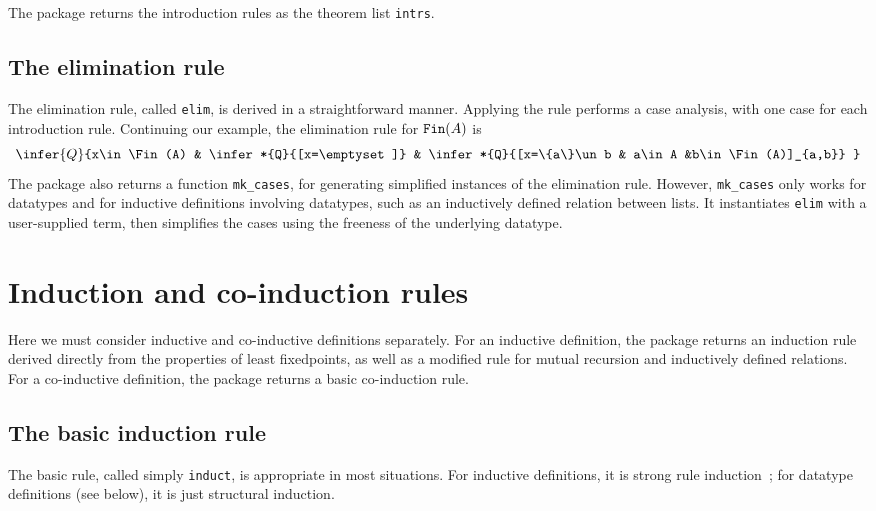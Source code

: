 The package returns the introduction rules as the theorem list {\tt intrs}.

\subsection{The elimination rule}
The elimination rule, called {\tt elim}, is derived in a straightforward
manner.  Applying the rule performs a case analysis, with one case for each
introduction rule.  Continuing our example, the elimination rule for ${\tt Fin}(A)$
is
\[ \infer{Q}{x\in\Fin(A) & \infer*{Q}{[x=\emptyset]}
                 & \infer*{Q}{[x=\{a\}\un b & a\in A &b\in\Fin(A)]_{a,b}} }
\]
The package also returns a function {\tt mk\_cases}, for generating simplified
instances of the elimination rule.  However, {\tt mk\_cases} only works for
datatypes and for inductive definitions involving datatypes, such as an
inductively defined relation between lists.  It instantiates {\tt elim}
with a user-supplied term, then simplifies the cases using the freeness of
the underlying datatype.


\section{Induction and co-induction rules}
Here we must consider inductive and co-inductive definitions separately.
For an inductive definition, the package returns an induction rule derived
directly from the properties of least fixedpoints, as well as a modified
rule for mutual recursion and inductively defined relations.  For a
co-inductive definition, the package returns a basic co-induction rule.

\subsection{The basic induction rule}\label{basic-ind-sec}
The basic rule, called simply {\tt induct}, is appropriate in most situations.
For inductive definitions, it is strong rule induction~\cite{camilleri92}; for
datatype definitions (see below), it is just structural induction.  

